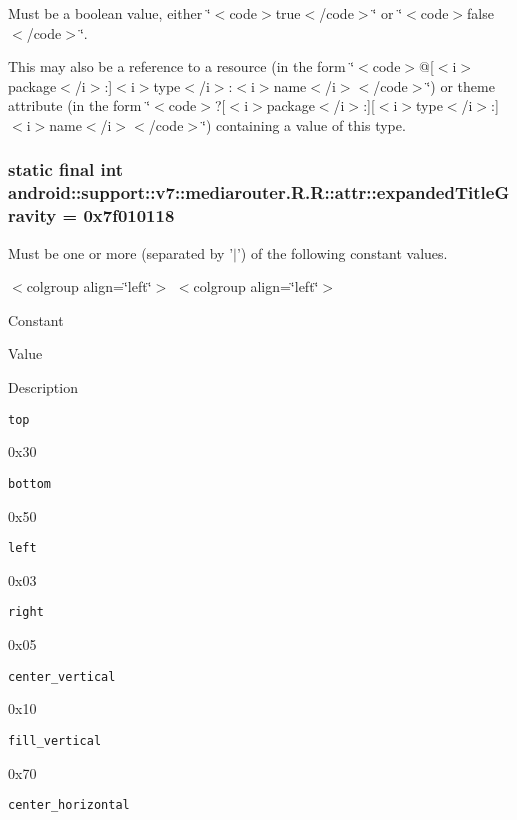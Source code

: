 Must be a boolean value, either \char`\"{}$<$code$>$true$<$/code$>$\char`\"{} or \char`\"{}$<$code$>$false$<$/code$>$\char`\"{}. 

This may also be a reference to a resource (in the form \char`\"{}$<$code$>$@\mbox{[}$<$i$>$package$<$/i$>$:\mbox{]}$<$i$>$type$<$/i$>$:$<$i$>$name$<$/i$>$$<$/code$>$\char`\"{}) or theme attribute (in the form \char`\"{}$<$code$>$?\mbox{[}$<$i$>$package$<$/i$>$:\mbox{]}\mbox{[}$<$i$>$type$<$/i$>$:\mbox{]}$<$i$>$name$<$/i$>$$<$/code$>$\char`\"{}) containing a value of this type. \hypertarget{classandroid_1_1support_1_1v7_1_1mediarouter_1_1_r_1_1attr_7966e5d63b066cb5673e8b8439cb8dcb}{
\subsubsection[{expandedTitleGravity}]{\setlength{\rightskip}{0pt plus 5cm}static final int android::support::v7::mediarouter.R.R::attr::expandedTitleGravity = 0x7f010118}}
\label{classandroid_1_1support_1_1v7_1_1mediarouter_1_1_r_1_1attr_7966e5d63b066cb5673e8b8439cb8dcb}


Must be one or more (separated by '$|$') of the following constant values. \begin{TabularC}{0}
\hline
\end{TabularC}
$<$colgroup align=\char`\"{}left\char`\"{}$>$ $<$colgroup align=\char`\"{}left\char`\"{}$>$ 

Constant

Value

Description 

{\tt top}

0x30

{\tt bottom}

0x50

{\tt left}

0x03

{\tt right}

0x05

{\tt center\_\-vertical}

0x10

{\tt fill\_\-vertical}

0x70

{\tt center\_\-horizontal}

